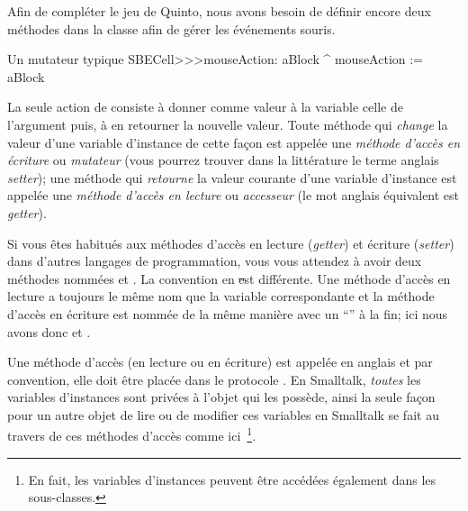 \documentclass[a4paper,10pt,twoside]{book}
\begin{document}
Afin de compléter le jeu de Quinto, nous avons besoin de définir encore deux méthodes dans la classe  afin de gérer les événements souris.
\begin{method}[mouseAction:]{Un mutateur typique}
SBECell>>>mouseAction: aBlock
   ^ mouseAction := aBlock
\end{method}

La seule action de  consiste à donner comme
valeur à la variable  celle de l'argument puis, à en
retourner la nouvelle valeur. Toute méthode qui \emph{change} la
valeur d'une variable d'instance de cette façon est appelée une
\emph{méthode d'accès en écriture} ou \emph{mutateur} (vous pourrez
trouver dans la littérature le terme anglais \emph{setter}); une
méthode qui \emph{retourne} la valeur courante d'une variable
d'instance est appelée une \emph{méthode d'accès en lecture} ou
\emph{accesseur} (le mot anglais équivalent est \emph{getter}).

Si vous \^etes habitués aux méthodes d'accès en lecture (\emph{getter})
et écriture (\emph{setter}) dans d'autres langages de programmation,
vous vous attendez à avoir deux méthodes nommées 
et .
La convention en \st est différente.
Une méthode d'accès en lecture a toujours le m\^eme nom que la variable
correspondante et la méthode d'accès en écriture est nommée de la m\^eme
manière avec un ``\ct{:}'' à la fin; ici nous avons donc
 et .

Une méthode d'accès (en lecture ou en écriture) est appelée
en anglais  et par convention, elle doit \^etre
placée dans le protocole .
En Smalltalk, \emph{toutes} les variables d'instances sont privées à
l'objet qui les possède, ainsi la seule façon pour un autre objet de
lire ou de modifier ces variables en Smalltalk se fait au travers de
ces méthodes d'accès comme ici~\footnote{En fait, les variables
  d'instances peuvent \^etre accédées également dans les sous-classes.}.
\end{document}
